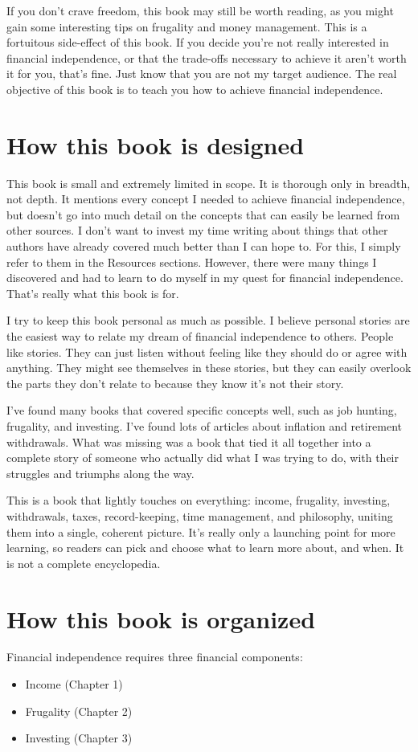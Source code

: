 If you don't crave freedom, this book may still be worth reading, as you might gain some interesting tips on frugality and money management. This is a fortuitous side-effect of this book. If you decide you're not really interested in financial independence, or that the trade-offs necessary to achieve it aren't worth it for you, that's fine. Just know that you are not my target audience. The real objective of this book is to teach you how to achieve financial independence.

\section{How this book is designed}
This book is small and extremely limited in scope. It is thorough only in breadth, not depth. It mentions every concept I needed to achieve financial independence, but doesn't go into much detail on the concepts that can easily be learned from other sources. I don't want to invest my time writing about things that other authors have already covered much better than I can hope to. For this, I simply refer to them in the Resources sections. However, there were many things I discovered and had to learn to do myself in my quest for financial independence. That's really what this book is for.

I try to keep this book personal as much as possible. I believe personal stories are the easiest way to relate my dream of financial independence to others. People like stories. They can just listen without feeling like they should do or agree with anything. They might see themselves in these stories, but they can easily overlook the parts they don't relate to because they know it's not their story.

I've found many books that covered specific concepts well, such as job hunting, frugality, and investing. I've found lots of articles about inflation and retirement withdrawals. What was missing was a book that tied it all together into a complete story of someone who actually did what I was trying to do, with their struggles and triumphs along the way.

This is a book that lightly touches on everything: income, frugality, investing, withdrawals, taxes, record-keeping, time management, and philosophy, uniting them into a single, coherent picture. It's really only a launching point for more learning, so readers can pick and choose what to learn more about, and when. It is not a complete encyclopedia.

\section{How this book is organized}
Financial independence requires three financial components:
\begin{itemize}
\item Income (Chapter 1)
\item Frugality (Chapter 2)
\item Investing (Chapter 3)
\end{itemize}


